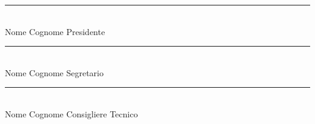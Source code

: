 \vspace{2cm}
\noindent\rule{7cm}{0.4pt} \\
Nome Cognome Presidente

\vspace{2cm}
\noindent\rule{7cm}{0.4pt} \\
Nome Cognome Segretario

\vspace{2cm}
\noindent\rule{7cm}{0.4pt} \\
Nome Cognome Consigliere Tecnico
